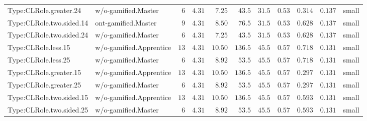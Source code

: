 \documentclass[6pt,a4paper]{article}
\begin{document}
{\begin{longtable}{llrrrrrrrrl}
Type:CLRole.greater.24&w/o-gamified.Master&$ 6$&$4.31$&$ 7.25$&$ 43.5$&$ 31.5$&$ 0.53$&$0.314$&$0.137$&small\tabularnewline
Type:CLRole.two.sided.14&ont-gamified.Master&$ 9$&$4.31$&$ 8.50$&$ 76.5$&$ 31.5$&$ 0.53$&$0.628$&$0.137$&small\tabularnewline
Type:CLRole.two.sided.24&w/o-gamified.Master&$ 6$&$4.31$&$ 7.25$&$ 43.5$&$ 31.5$&$ 0.53$&$0.628$&$0.137$&small\tabularnewline
Type:CLRole.less.15&w/o-gamified.Apprentice&$13$&$4.31$&$10.50$&$136.5$&$ 45.5$&$ 0.57$&$0.718$&$0.131$&small\tabularnewline
Type:CLRole.less.25&w/o-gamified.Master&$ 6$&$4.31$&$ 8.92$&$ 53.5$&$ 45.5$&$ 0.57$&$0.718$&$0.131$&small\tabularnewline
Type:CLRole.greater.15&w/o-gamified.Apprentice&$13$&$4.31$&$10.50$&$136.5$&$ 45.5$&$ 0.57$&$0.297$&$0.131$&small\tabularnewline
Type:CLRole.greater.25&w/o-gamified.Master&$ 6$&$4.31$&$ 8.92$&$ 53.5$&$ 45.5$&$ 0.57$&$0.297$&$0.131$&small\tabularnewline
\newpage
Type:CLRole.two.sided.15&w/o-gamified.Apprentice&$13$&$4.31$&$10.50$&$136.5$&$ 45.5$&$ 0.57$&$0.593$&$0.131$&small\tabularnewline
Type:CLRole.two.sided.25&w/o-gamified.Master&$ 6$&$4.31$&$ 8.92$&$ 53.5$&$ 45.5$&$ 0.57$&$0.593$&$0.131$&small\tabularnewline
\hline
\end{longtable}}
\end{document}
